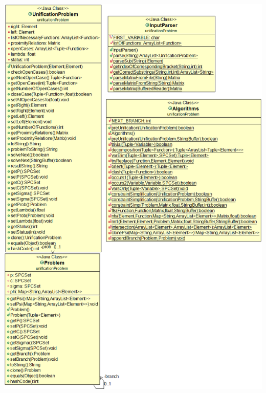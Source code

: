 \documentclass{article}
\begin{document}
\newpage
\includegraphics[scale=0.5]{UnificationProblemModel}
\newpage
\end{document}
